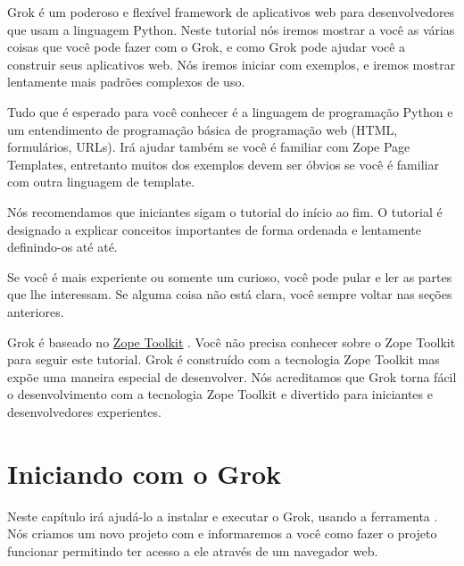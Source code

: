 \documentclass[a4paper,12pt,portuguese]{manual}
\begin{document}
Grok é um poderoso e flexível framework de aplicativos web para
desenvolvedores que usam a linguagem Python. Neste tutorial nós iremos
mostrar a você as várias coisas que você pode fazer com o Grok, e
como Grok pode ajudar você a construir seus aplicativos web. Nós
iremos iniciar com exemplos, e iremos mostrar lentamente mais padrões
complexos de uso.

Tudo que é esperado para você conhecer é a linguagem de programação
Python e um entendimento de programação básica de programação web
(HTML, formulários, URLs). Irá ajudar também se você é familiar com
Zope Page Templates, entretanto muitos dos exemplos devem ser óbvios se
você é familiar com outra linguagem de template.

Nós recomendamos que iniciantes sigam o tutorial do início ao fim. O
tutorial é designado a explicar conceitos importantes de forma
ordenada e lentamente definindo-os até até.

Se você é mais experiente ou somente um curioso, você pode pular e
ler as partes que lhe interessam. Se alguma coisa não está clara,
você sempre voltar nas seções anteriores.

Grok é baseado no \href{http://docs.zope.org/zopetoolkit/}{Zope Toolkit} . Você não precisa conhecer sobre o
Zope Toolkit para seguir este tutorial. Grok é construído com a
tecnologia Zope Toolkit mas expõe uma maneira especial de desenvolver.
Nós acreditamos que Grok torna fácil o desenvolvimento com a tecnologia
Zope Toolkit e divertido para iniciantes e desenvolvedores experientes.


\chapter{Iniciando com o Grok}

Neste capítulo irá ajudá-lo a instalar e executar o Grok, usando a
ferramenta . Nós criamos um novo projeto com
 e informaremos a você como fazer o projeto funcionar
permitindo ter acesso a ele através de um navegador web.
\end{document}
